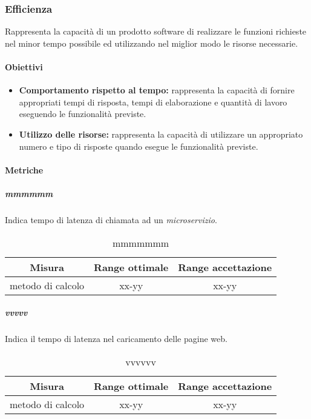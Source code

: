 	\subsubsection{Efficienza}
	Rappresenta la capacità di un prodotto software di realizzare le funzioni richieste nel minor tempo possibile ed utilizzando nel miglior modo le risorse necessarie.
		
		\paragraph{Obiettivi}
			\begin{itemize}
				\item \textbf{Comportamento rispetto al tempo:} rappresenta la capacità di fornire appropriati tempi di risposta, tempi di elaborazione e quantità di lavoro eseguendo le funzionalità previste.
				\item \textbf{Utilizzo delle risorse:} rappresenta la capacità di utilizzare un appropriato numero e tipo di risposte quando esegue le funzionalità previste.
			\end{itemize}
		
		\paragraph{Metriche}
			\subparagraph{mmmmmm}
			Indica tempo di latenza di chiamata ad un \textit{microservizio}.
			
			\begin{table}[H]
				\begin{center}
					\begin{tabular}{|c|c|c|}
						\hline
						\textbf{Misura} & \textbf{Range ottimale} & \textbf{Range accettazione} \\
						\hline
						metodo di calcolo & xx-yy  & xx-yy \\
						\hline
					\end{tabular}
				\end{center}
				\caption{mmmmmmm}
			\end{table}
			
			\subparagraph{vvvvv}
			Indica il tempo di latenza nel caricamento delle pagine web.
			\begin{table}[H]
				\begin{center}
					\begin{tabular}{|c|c|c|}
						\hline
						\textbf{Misura} & \textbf{Range ottimale} & \textbf{Range accettazione} \\
						\hline
						metodo di calcolo & xx-yy  & xx-yy \\
						\hline
					\end{tabular}
				\end{center}
				\caption{vvvvvv}
			\end{table}
			

